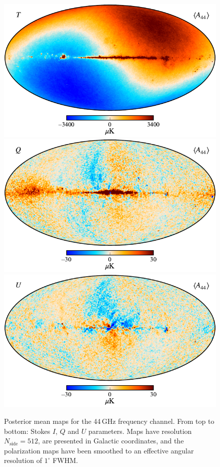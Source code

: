 \documentclass[twocolumn]{aa}
\begin{document}
\begin{figure}[p]
  \center
  \includegraphics[width=12cm]{figs/BP_044_n0512_v2_I_MEAN_w12_n512_cb_c-planck.pdf}\\
  \includegraphics[width=12cm]{figs/BP_044_n0512_v2_Q_MEAN_w12_n512_60arcmin_cb_c-planck.pdf}\\
  \includegraphics[width=12cm]{figs/BP_044_n0512_v2_U_MEAN_w12_n512_60arcmin_cb_c-planck.pdf}
  \caption{Posterior mean maps for the 44\,GHz frequency channel. From top to bottom: Stokes $I$, $Q$ and $U$ parameters. Maps have resolution $N_{\mathrm{side}} = 512$, are presented in Galactic coordinates, and the polarization maps have been smoothed to an effective angular resolution of $1^\circ$ FWHM.}\label{fig:freq_maps44}
\end{figure}
\end{document}
